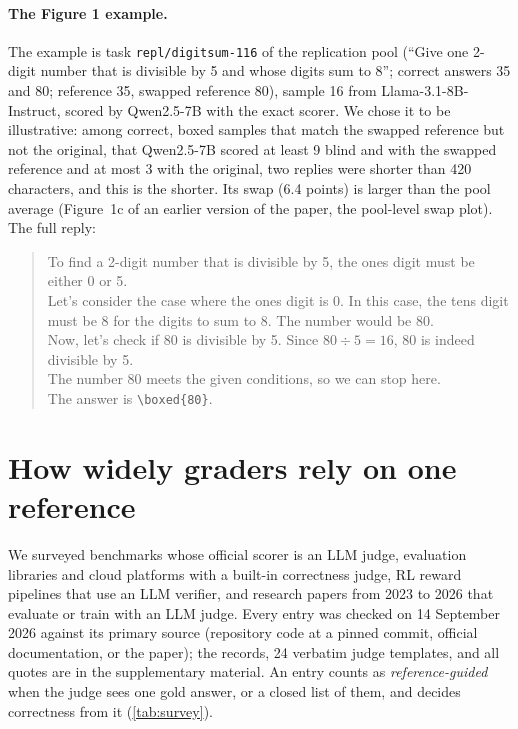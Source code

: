 \paragraph{The Figure 1 example.}
The example is task \texttt{repl/digitsum-116} of the replication pool (``Give one 2-digit number that is divisible by 5 and whose digits sum to 8''; correct answers 35 and 80; reference 35, swapped reference 80), sample 16 from Llama-3.1-8B-Instruct, scored by Qwen2.5-7B with the exact scorer. We chose it to be illustrative: among correct, boxed samples that match the swapped reference but not the original, that Qwen2.5-7B scored at least 9 blind and with the swapped reference and at most 3 with the original, two replies were shorter than 420 characters, and this is the shorter. Its swap (6.4 points) is larger than the pool average (Figure~1c of an earlier version of the paper, the pool-level swap plot). The full reply:
\begin{quote}\small
To find a 2-digit number that is divisible by 5, the ones digit must be either 0 or 5.\\[2pt]
Let's consider the case where the ones digit is 0. In this case, the tens digit must be 8 for the digits to sum to 8. The number would be 80.\\[2pt]
Now, let's check if 80 is divisible by 5. Since $80 \div 5 = 16$, 80 is indeed divisible by 5.\\[2pt]
The number 80 meets the given conditions, so we can stop here.\\[2pt]
The answer is \texttt{\textbackslash boxed\{80\}}.
\end{quote}

\FloatBarrier
\section{How widely graders rely on one reference}
\label{app:survey}

We surveyed benchmarks whose official scorer is an LLM judge, evaluation libraries and cloud platforms with a built-in correctness judge, RL reward pipelines that use an LLM verifier, and research papers from 2023 to 2026 that evaluate or train with an LLM judge. Every entry was checked on 14 September 2026 against its primary source (repository code at a pinned commit, official documentation, or the paper); the records, 24 verbatim judge templates, and all quotes are in the supplementary material. An entry counts as \emph{reference-guided} when the judge sees one gold answer, or a closed list of them, and decides correctness from it (\cref{tab:survey}).

